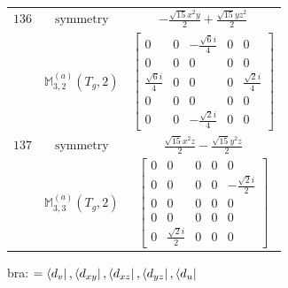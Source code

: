 \documentclass[fleqn,8pt,landscape]{jsarticle}
\begin{document}
\begin{longtable}{ccc}
$ 136 $ & $ \text{symmetry} $ & $ - \frac{\sqrt{15} x^{2} y}{2} + \frac{\sqrt{15} y z^{2}}{2} $ \\
$  $ & $ \mathbb{M}_{3,2}^{(a)}(T_{g},2) $ & $ \begin{bmatrix} 0 & 0 & - \frac{\sqrt{6} i}{4} & 0 & 0 \\ 0 & 0 & 0 & 0 & 0 \\ \frac{\sqrt{6} i}{4} & 0 & 0 & 0 & \frac{\sqrt{2} i}{4} \\ 0 & 0 & 0 & 0 & 0 \\ 0 & 0 & - \frac{\sqrt{2} i}{4} & 0 & 0 \end{bmatrix} $ \\ \hline
$ 137 $ & $ \text{symmetry} $ & $ \frac{\sqrt{15} x^{2} z}{2} - \frac{\sqrt{15} y^{2} z}{2} $ \\
$  $ & $ \mathbb{M}_{3,3}^{(a)}(T_{g},2) $ & $ \begin{bmatrix} 0 & 0 & 0 & 0 & 0 \\ 0 & 0 & 0 & 0 & - \frac{\sqrt{2} i}{2} \\ 0 & 0 & 0 & 0 & 0 \\ 0 & 0 & 0 & 0 & 0 \\ 0 & \frac{\sqrt{2} i}{2} & 0 & 0 & 0 \end{bmatrix} $ \\ \hline
\end{longtable}
bra: $=\bra{d_{v}}, \bra{d_{xy}}, \bra{d_{xz}}, \bra{d_{yz}}, \bra{d_{u}}$
\end{document}
